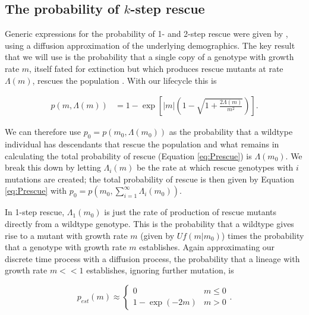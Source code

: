 \documentclass[9pt,twocolumn,twoside,lineno]{gsajnl}
\begin{document}
\subsection{The probability of $k$-step rescue}

Generic expressions for the probability of 1- and 2-step rescue were given by \cite{Martin2013}, using a diffusion approximation of the underlying demographics.
The key result that we will use is the probability that a single copy of a genotype with growth rate $m$, itself fated for extinction but which produces rescue mutants at rate $\Lambda(m)$, rescues the population \citep[equation S1.5 in][]{Martin2013}.
With our lifecycle this is \citep[c.f., equation A.3 in][]{Iwasa2004}

\begin{equation}\label{eq:S15}
\begin{aligned}
p(m,\Lambda(m)) 
   &= 1 - \exp \left[  |m| \left(1 - \sqrt{1+\frac{2\Lambda(m)}{m^2}} \right) \right].
\end{aligned}
\end{equation}

\noindent We can therefore use $p_0 = p(m_0,\Lambda(m_0))$ as the probability that a wildtype individual has descendants that rescue the population and what remains in calculating the total probability of rescue (Equation \ref{eq:Prescue}) is $\Lambda(m_0)$.
We break this down by letting $\Lambda_i(m)$ be the rate at which rescue genotypes with $i$ mutations are created; the total probability of rescue is then given by Equation \ref{eq:Prescue} with $p_0=p(m_0, \sum_{i=1}^\infty\Lambda_i(m_0))$.

In 1-step rescue, $\Lambda_1(m_0)$ is just the rate of production of rescue mutants directly from a wildtype genotype.
This is the probability that a wildtype gives rise to a mutant with growth rate $m$ (given by $U f(m|m_0)$) times the probability that a genotype with growth rate $m$ establishes.
Again approximating our discrete time process with a diffusion process, the probability that a lineage with growth rate $m<<1$ establishes, ignoring further mutation, is \citep{Martin2013}

\begin{equation}\label{eq:pestm}
p_{est}(m) \approx
\begin{cases}
	0 & m \leq 0 \\
	1-\exp(-2 m) & m > 0
\end{cases}.
\end{equation}
\end{document}
